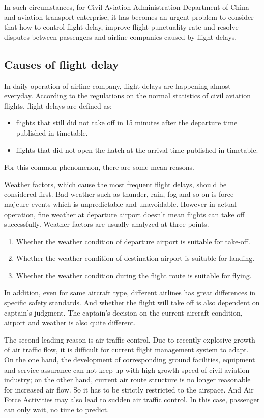 \documentclass[senior]{IPSstyle}
\begin{document}
In such circumstances, for Civil Aviation Administration Department of China and aviation transport enterprise, it has becomes an urgent problem to consider that how to control flight delay, improve flight punctuality rate and resolve disputes between passengers and airline companies caused by flight delays.

\subsection{Causes of flight delay}
In daily operation of airline company, flight delays are happening almost everyday.
According to the regulations on the normal statistics of civil aviation flights, flight delays are defined as:
\begin{itemize}
    \item flights that still did not take off in 15 minutes after the departure time published in timetable.
    \item flights that did not open the hatch at the arrival time published in timetable.
\end{itemize}
For this common phenomenon, there are some mean reasons. 

Weather factors, which cause the most frequent flight delays, should be considered first. 
Bad weather such as thunder, rain, fog and so on is force majeure events which is unpredictable and unavoidable. 
However in actual operation, fine weather at departure airport doesn't mean flights can take off successfully. 
Weather factors are usually analyzed at three points.
\begin{enumerate}
\item Whether the weather condition of departure airport is suitable for take-off. 
\item Whether the weather condition of destination airport is suitable for landing.
\item Whether the weather condition during the flight route is suitable for flying.
\end{enumerate}

In addition, even for same aircraft type, different airlines has great differences in specific safety standards.
And whether the flight will take off is also dependent on captain's judgment. 
The captain's decision on the current aircraft condition, airport and weather is also quite different.

The second leading reason is air traffic control. 
Due to recently explosive growth of air traffic flow, it is difficult for current flight management system to adapt. 
On the one hand, the development of corresponding ground facilities, equipment and service assurance can not keep up with high growth speed of civil aviation industry; 
on the other hand, current air route structure is no longer reasonable for increased air flow. 
So it has to be strictly restricted to the airspace.
And Air Force Activities may also lead to sudden air traffic control. In this case, passenger can only wait, no time to predict.
\end{document}
